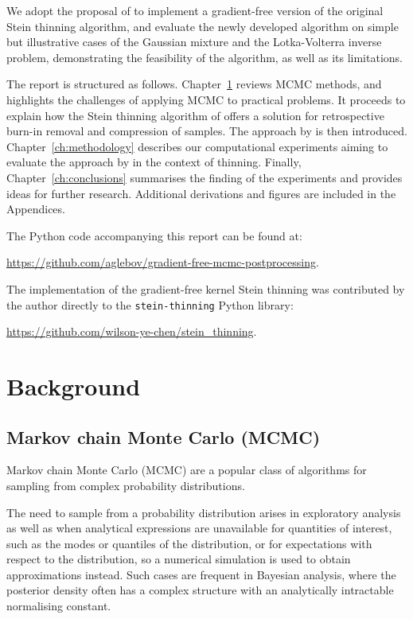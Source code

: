 \documentclass[11pt,a4paper]{report}
\begin{document}
We adopt the proposal of \cite{fisherGradientFreeKernelStein2024} to implement a gradient-free version of the original Stein thinning algorithm, and evaluate the newly developed algorithm on simple but illustrative cases of the Gaussian mixture and the Lotka-Volterra inverse problem, demonstrating the feasibility of the algorithm, as well as its limitations.

The report is structured as follows. Chapter~\ref{ch:background} reviews MCMC methods, and highlights the challenges of applying MCMC to practical problems. It proceeds to explain how the Stein thinning algorithm of \cite{riabizOptimalThinningMCMC2022} offers a solution for retrospective burn-in removal and compression of samples. The approach by \cite{fisherGradientFreeKernelStein2024} is then introduced. Chapter~\ref{ch:methodology} describes our computational experiments aiming to evaluate the approach by \cite{fisherGradientFreeKernelStein2024} in the context of thinning. Finally, Chapter~\ref{ch:conclusions} summarises the finding of the experiments and provides ideas for further research. Additional derivations and figures are included in the Appendices.

The Python code accompanying this report can be found at:
\begin{center}
\url{https://github.com/aglebov/gradient-free-mcmc-postprocessing}.
\end{center}

The implementation of the gradient-free kernel Stein thinning was contributed by the author directly to the \texttt{stein-thinning} Python library:
\begin{center}
\url{https://github.com/wilson-ye-chen/stein_thinning}.
\end{center}

\chapter{Background}
\label{ch:background}

\section{Markov chain Monte Carlo (MCMC)}

Markov chain Monte Carlo (MCMC) are a popular class of algorithms for sampling from complex probability distributions.

The need to sample from a probability distribution arises in exploratory analysis as well as when analytical expressions are unavailable for quantities of interest, such as the modes or quantiles of the distribution, or for expectations with respect to the distribution, so a numerical simulation is used to obtain approximations instead. Such cases are frequent in Bayesian analysis, where the posterior density often has a complex structure with an analytically intractable normalising constant.
\end{document}
